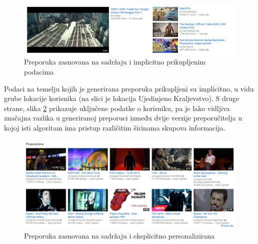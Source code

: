 \documentclass[times, utf8, diplomski, numeric]{fer}
\begin{document}
\begin{figure}[!htb]
	\centering
	\includegraphics[width=14.21cm]{images/content/nepersonalizirani.png}
	\caption{Preporuka zasnovana na sadržaju i implicitno prikupljenim podacima}
	\label{fig:contentnonpers}
\end{figure}

Podaci na temelju kojih je generirana preporuka prikupljeni su implicitno, u
vidu grube lokacije korisnika (na slici je lokacija Ujedinjeno Kraljevstvo). S
druge strane, slika \ref{fig:contentpers} prikazuje uključene podatke o
korisniku, pa je lako vidljiva značajna razlika u generiranoj preporuci između
dvije verzije preporučitelja u kojoj isti algoritam ima pristup različitim
širinama skupova informacija. 

\begin{figure}[!htb]
	\centering
	\includegraphics[width=14.21cm]{images/content/personalizirani.png}
	\caption{Preporuka zasnovana na sadržaju i eksplicitno personalizirana}
	\label{fig:contentpers}
\end{figure}
\end{document}

